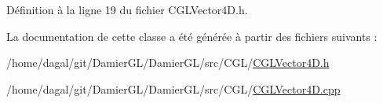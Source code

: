 Définition à la ligne 19 du fichier C\-G\-L\-Vector4\-D.\-h.



La documentation de cette classe a été générée à partir des fichiers suivants \-:\begin{DoxyCompactItemize}
\item 
/home/dagal/git/\-Damier\-G\-L/\-Damier\-G\-L/src/\-C\-G\-L/\hyperlink{_c_g_l_vector4_d_8h}{C\-G\-L\-Vector4\-D.\-h}\item 
/home/dagal/git/\-Damier\-G\-L/\-Damier\-G\-L/src/\-C\-G\-L/\hyperlink{_c_g_l_vector4_d_8cpp}{C\-G\-L\-Vector4\-D.\-cpp}\end{DoxyCompactItemize}

